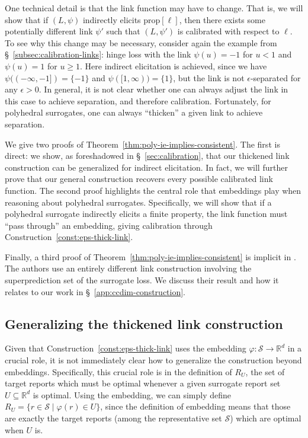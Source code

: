 \documentclass[twoside,11pt]{article}
\newcommand{\reals}{\mathbb{R}}
\newcommand{\prop}[1]{\mathrm{prop}[#1]}
\newcommand{\Sc}{\mathcal{S}}
\begin{document}
One technical detail is that the link function may have to change.
That is, we will show that if $(L,\psi)$ indirectly elicits $\prop{\ell}$, then there exists some potentially different link $\psi'$ such that $(L,\psi')$ is calibrated with respect to $\ell$.
To see why this change may be necessary, consider again the example from \S~\ref{subsec:calibration-links}:
hinge loss with the link $\psi(u) = -1$ for $u < 1$ and $\psi(u) = 1$ for $u\geq 1$.
Here indirect elicitation is achieved, since we have $\psi((-\infty,-1]) = \{-1\}$ and $\psi([1,\infty)) = \{1\}$, but the link is not $\epsilon$-separated for any $\epsilon>0$.
In general, it is not clear whether one can always adjust the link in this case to achieve separation, and therefore calibration.
Fortunately, for polyhedral surrogates, one can always ``thicken'' a given link to achieve separation.

We give two proofs of Theorem~\ref{thm:poly-ie-implies-consistent}.
The first is direct: we show, as foreshadowed in \S~\ref{sec:calibration}, that our thickened link construction can be generalized for indirect elicitation.
In fact, we will further prove that our general construction recovers every possible calibrated link function.
The second proof highlights the central role that embeddings play when reasoning about polyhedral surrogates.
Specifically, we will show that if a polyhedral surrogate indirectly elicits a finite property, the link function must ``pass through'' an embedding, giving calibration through Construction~\ref{const:eps-thick-link}.

Finally, a third proof of Theorem~\ref{thm:poly-ie-implies-consistent} is implicit in \citet[Theorem 8]{ramaswamy2016convex}.
The authors use an entirely different link construction involving the superprediction set of the surrogate loss.
We discuss their result and how it relates to our work in \S~\ref{app:ccdim-construction}.

\subsection{Generalizing the thickened link construction}

Given that Construction~\ref{const:eps-thick-link} uses the embedding $\varphi:\Sc\to\reals^d$ in a crucial role, it is not immediately clear how to generalize the construction beyond embeddings.
Specifically, this crucial role is in the definition of $R_U$, the set of target reports which must be optimal whenever a given surrogate report set $U\subseteq\reals^d$ is optimal.
Using the embedding, we can simply define $R_U = \{ r\in\Sc \mid \varphi(r) \in U \}$, since the definition of embedding means that those are exactly the target reports (among the representative set $\Sc$) which are optimal when $U$ is.
\end{document}
